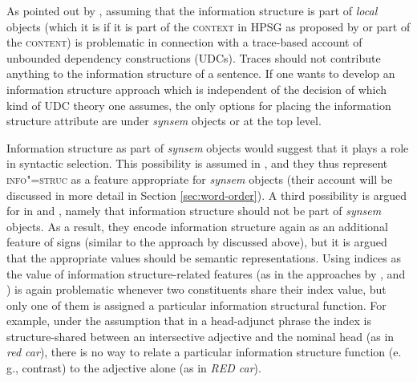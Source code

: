 \documentclass[output=paper]{langsci/langscibook}
\begin{document}
As pointed out by \cite{deKuthy2002a}, assuming that the information
structure is part of \textit{local} objects (which it is if it is part
of the \textsc{context} in HPSG as proposed by \citealt{EV96a} or part of
the \textsc{content}) is problematic in connection with a trace-based
account of unbounded dependency constructions (UDCs). Traces should not contribute
anything to the information structure of a sentence. If one wants to
develop an information structure approach which is independent of the
decision of which kind of UDC theory one assumes, the only options for
placing the information structure attribute are under \textit{synsem}
objects or at the top level.

Information structure as part of \textit{synsem} objects would suggest
that it plays a role in syntactic selection. This possibility is
assumed in \cite{BC2011b}, and they thus represent
\textsc{info"=struc} as a feature appropriate for \textit{synsem}
objects (their account will be discussed in more detail in Section
\ref{sec:word-order}).  A third possibility is argued for in
\cite{deKuthy2002a} and \cite{Bildhauer2008a}, namely that information
structure should not be part of \textit{synsem} objects. As a result,
they encode information structure again as an additional feature of
signs (similar to the approach by \citealt{Mandahar94a-u} discussed above), but
it is argued that the appropriate values should be semantic
representations. Using indices as the value of information
structure-related features (as in the approaches by
\citealt{Paggio2009a-u}, \citealt{song-bender:2012} and \citealt{song2018}) is again
problematic whenever two constituents share their index value, but
only one of them is assigned a particular information structural
function. For example, under the assumption that in a head-adjunct
phrase the index is structure-shared between an intersective adjective
and the nominal head (as in \textit{red car}), there is no way to
relate a particular information structure function (e. g., contrast) to the adjective
alone (as in \textit{RED car}).
\end{document}
